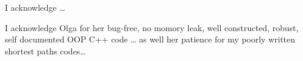 I acknowledge \ldots

I acknowledge Olga for her bug-free, no momory leak, well constructed,
robust, self documented OOP C++ code \ldots
as well her patience for my poorly written shortest paths codes\ldots
